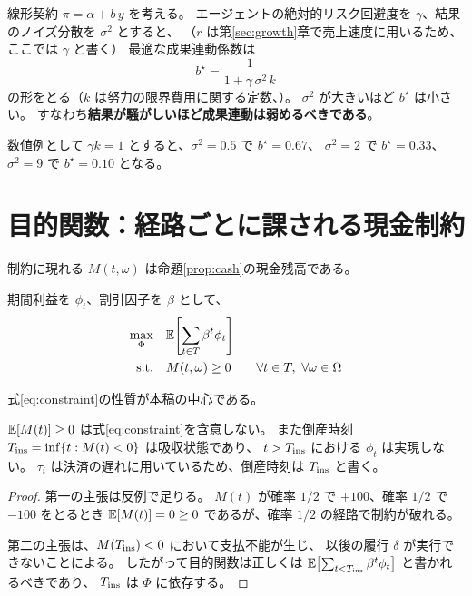 \begin{example}[成果連動の最適強度]
\label{ex:bstar}
線形契約 $\pi = \alpha + b\,y$ を考える。
エージェントの絶対的リスク回避度を $\gamma$、結果のノイズ分散を $\sigma^2$ とすると、
（$r$ は第\ref{sec:growth}章で売上速度に用いるため、ここでは $\gamma$ と書く）
最適な成果連動係数は
\begin{equation}
b^{\star} = \frac{1}{1+\gamma\,\sigma^{2}\,k}
\label{eq:bstar}
\end{equation}
の形をとる（$k$ は努力の限界費用に関する定数、\cite{holmstrom1991}）。
$\sigma^2$ が大きいほど $b^\star$ は小さい。
すなわち\textbf{結果が騒がしいほど成果連動は弱めるべきである}。

数値例として $\gamma k = 1$ とすると、$\sigma^2=0.5$ で $b^\star=0.67$、
$\sigma^2=2$ で $b^\star=0.33$、$\sigma^2=9$ で $b^\star=0.10$ となる。
\end{example}

\section{目的関数：経路ごとに課される現金制約}
\label{sec:objective}

制約に現れる $M(t,\omega)$ は命題\ref{prop:cash}の現金残高である。

\begin{definition}[最適化問題]
期間利益を $\phi_t$、割引因子を $\beta$ として、
\begin{align}
\max_{\Phi}\quad & \E\!\left[\sum_{t\in T}\beta^{t}\phi_t\right] \label{eq:obj}\\
\text{s.t.}\quad & M(t,\omega)\geq 0 \qquad \forall t\in T,\ \forall\omega\in\Omega \label{eq:constraint}
\end{align}
\end{definition}

式\eqref{eq:constraint}の性質が本稿の中心である。

\begin{proposition}[経路制約の非可換性]
\label{prop:pathwise}
$\mathbb{E}[M(t)]\geq 0$ は式\eqref{eq:constraint}を含意しない。
また倒産時刻 $T_{\mathrm{ins}}=\inf\{t: M(t)<0\}$ は吸収状態であり、
$t>T_{\mathrm{ins}}$ における $\phi_t$ は実現しない。
$\tau_i$ は決済の遅れに用いているため、倒産時刻は $T_{\mathrm{ins}}$ と書く。
\end{proposition}

\begin{proof}
第一の主張は反例で足りる。
$M(t)$ が確率 $1/2$ で $+100$、確率 $1/2$ で $-100$ をとるとき
$\mathbb{E}[M(t)]=0\geq 0$ であるが、確率 $1/2$ の経路で制約が破れる。

第二の主張は、$M(T_{\mathrm{ins}})<0$ において支払不能が生じ、
以後の履行 $\delta$ が実行できないことによる。
したがって目的関数は正しくは
$\mathbb{E}\bigl[\sum_{t<T_{\mathrm{ins}}}\beta^t\phi_t\bigr]$ と書かれるべきであり、
$T_{\mathrm{ins}}$ は $\Phi$ に依存する。
\end{proof}

